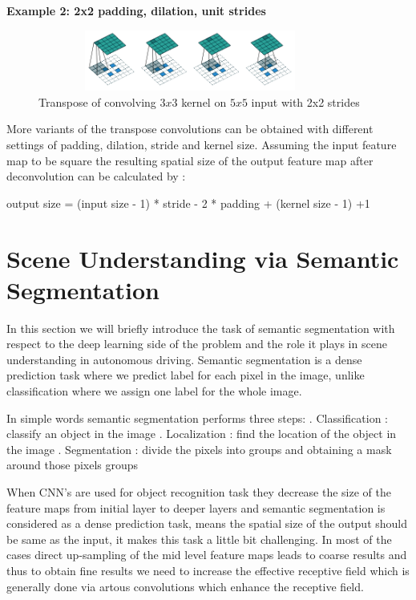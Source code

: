     \textbf{Example 2: 2x2 padding, dilation, unit strides}
     \begin{figure}[h]
    \centering
    \includegraphics[width=10cm, height =2cm]{images/transpose_case2.png}
    \caption{Transpose of convolving $3x3$ kernel on $5x5$ input with 2x2 strides \cite{https://doi.org/10.48550/arxiv.1603.07285}}
    \end{figure}
    
    More variants of the transpose convolutions can be obtained with different settings of padding, dilation, stride and kernel size. Assuming the input feature map to be square the resulting spatial size of the output feature map after deconvolution can be calculated by \cite{https://doi.org/10.48550/arxiv.1603.07285}:
    
       \begin{center}
       output size = (input size - 1) * stride - 2 * padding + (kernel size - 1) +1
   \end{center}
    

    \section{Scene Understanding via Semantic Segmentation}
    In this section we will briefly introduce the task of semantic segmentation with respect to the deep learning side of the problem and the role it plays in scene understanding in autonomous driving. Semantic segmentation is a dense prediction task where we predict label for each pixel in the image, unlike classification where we assign one label for the whole image.
    
    In simple words semantic segmentation performs three steps: . Classification : classify an object in the image  . Localization : find the location of the object in the image . Segmentation : divide the pixels into groups and obtaining a mask around those pixels groups 
    
     When CNN's are used for object recognition task they decrease the size of the feature maps from initial layer to deeper layers and semantic segmentation is considered as a dense prediction task, means the spatial size of the output should be same as the input, it makes this task a little bit challenging. In most of the cases direct up-sampling of the mid level feature maps leads to coarse results and thus to obtain fine results we need to increase the effective receptive field which is generally done via artous convolutions which enhance the receptive field. 
     
